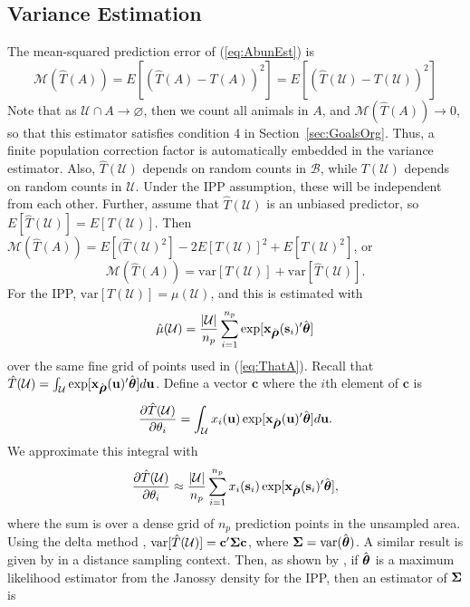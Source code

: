 \documentclass[12pt, titlepage]{article}\usepackage[]{graphicx}\usepackage[]{color}
\newcommand{\bx}{\ensuremath{\mathbf{x}}}
\newcommand{\bs}{\ensuremath{\mathbf{s}}}
\newcommand{\bu}{\ensuremath{\mathbf{u}}}
\def\bc{\mathbf{c}}
\def\bs{\mathbf{s}}
\def\bu{\mathbf{u}}
\def\cB{\mathcal{B}}
\def\cU{\mathcal{U}}
\def\cM{\mathcal{M}}
\def\btheta{\mbox{\boldmath $\theta$}}
\def\brho{\mbox{\boldmath $\rho$}}
\def\bSigma{\mbox{\boldmath $\Sigma$}}
\def\var{\textrm{var}}
\begin{document}
\subsection{Variance Estimation} \label{sec:VarEst}

The mean-squared prediction error of (\ref{eq:AbunEst}) is
\begin{equation} \label{eq:varT}
		\cM(\hat{T}(A)) = E[(\hat{T}(A) - T(A))^2] = E[(\hat{T}(\cU) - T(\cU))^2]
\end{equation}
Note that as $\cU \cap A \to \varnothing$, then we count all animals in $A$, and $\cM(\widehat{T}(A)) \to 0$, so that this estimator satisfies condition 4 in Section~\ref{sec:GoalsOrg}. Thus, a finite population correction factor is automatically embedded in the variance estimator.  Also, $\hat{T}(\cU)$ depends on random counts in $\cB$, while $T(\cU)$ depends on random counts in $\cU$.  Under the IPP assumption, these will be independent from each other. Further, assume that $\hat{T}(\cU)$ is an unbiased predictor, so $E[\hat{T}(\cU)] = E[T(\cU)]$. Then $\cM(\hat{T}(A)) = E[(\hat{T}(\cU)^2] - 2E[T(\cU)]^2 + E[T(\cU)^2]$, or 
\[
		\cM(\hat{T}(A)) = \var[T(\cU)] + \var[\hat{T}(\cU)].
\]
For the IPP, $\var[T(\cU)] = \mu(\cU)$, and this is estimated with
\begin{equation} \label{eq:HatMuCU}
  \hat{\mu}(\cU) = \frac{|\cU|}{n_p}\sum_{i=1}^{n_p} \exp[\bx_{\hat{\brho}}(\bs_i)^\prime\hat{\btheta}]
\end{equation} 
over the same fine grid of points used in (\ref{eq:ThatA}). Recall that $\hat{T}(\cU) = \int_{\cU}\exp[\bx_{\hat{\brho}}(\bu)^\prime\hat{\btheta}] d\bu$. Define a vector $\bc$ where the $i$th element of $\bc$ is
\[
	\frac{\partial \hat{T}(\cU)}{\partial \theta_i} = \int_{\cU}x_i(\bu)\exp[\bx_{\hat{\brho}}(\bu)^\prime\hat{\btheta}] d\bu.
\]
We approximate this integral with
\begin{equation} \label{eq:ci}
	\frac{\partial \hat{T}(\cU)}{\partial \theta_i} \approx 
    \frac{|\cU|}{n_p}\sum_{i=1}^{n_p} x_i(\bs_i)\exp[\bx_{\hat{\brho}}(\bs_i)^\prime\hat{\btheta}],
\end{equation}
where the sum is over a dense grid of $n_p$ prediction points in the unsampled area. Using the delta method \citep{Dorf:a:1938, Ver:who:2012}, $\var[\hat{T}(\cU)] = \bc^\prime \bSigma \bc$,  where $\bSigma = \var(\hat{\btheta})$.  A similar result is given by \citet{John:Laak:Ver:mode:2010} in a distance sampling context.  Then, as shown by \citet{Rath:Cres:asym:1994}, if $\hat{\btheta}$ is a maximum likelihood estimator from the Janossy density for the IPP, then an estimator of $\bSigma$ is
\end{document}
